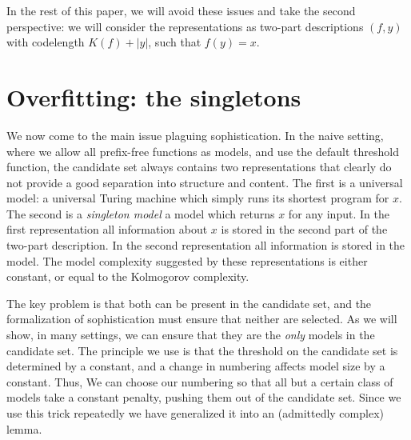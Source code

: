 \documentclass{style/llncs}
\begin{document}
In the rest of this paper, we will avoid these issues and take the second perspective: we will consider the representations as two-part descriptions $(f, y)$ with codelength $K(f) + |y|$, such that $f(y)=x$. 

\section{Overfitting: the singletons}

We now come to the main issue plaguing sophistication. In the naive setting, where we allow all prefix-free functions as models, and use the default threshold function, the candidate set always contains two representations that clearly do not provide a good separation into structure and content. The first is a universal model: a universal Turing machine which simply runs its shortest program for $x$. The second is a \emph{singleton model} a model which returns $x$ for any input. In the first representation all information about $x$ is stored in the second part of the two-part description. In the second representation all information is stored in the model. The model complexity suggested by these representations is either constant, or equal to the Kolmogorov complexity.

The key problem is that both can be present in the candidate set, and the formalization of sophistication must ensure that neither are selected. As we will show, in many settings, we can ensure that they are the \emph{only} models in the candidate set. The principle we use is that the threshold on the candidate set is determined by a constant, and a change in numbering affects model size by a constant. Thus, We can choose our numbering  so that all but a certain class of models take a constant penalty, pushing them out of the candidate set. Since we use this trick repeatedly we have generalized it into an (admittedly complex) lemma.
\end{document}
